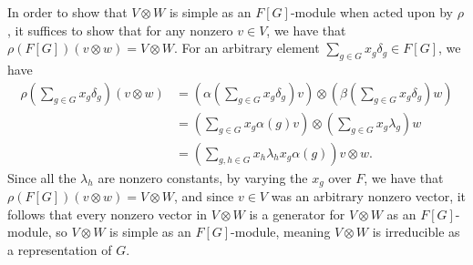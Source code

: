 \documentclass[10pt]{mypackage}
\begin{document}
\begin{solution}
\begin{enumerate}[(a)]
      In order to show that $V\otimes W$ is simple as an $F[G]$-module when acted upon by $\rho$, it suffices to show that for any nonzero $v\in V$, we have that $\rho\left( F[G] \right)\left( v\otimes w \right) = V\otimes W$. For an arbitrary element $\sum_{g\in G}x_g \delta_g\in F[G]$, we have
      \begin{align*}
        \rho\left( \sum_{g\in G}x_g\delta_g \right)\left( v\otimes w \right) &= \left( \alpha\left( \sum_{g\in G}x_g\delta_g \right)v \right)\otimes \left( \beta\left( \sum_{g\in G}x_g \delta_g \right)w \right)\\
                                                                             &= \left( \sum_{g\in G}x_g\alpha(g)v \right)\otimes \left( \sum_{g\in G}x_g\lambda_g \right)w\\
                                                                             &= \left( \sum_{g,h\in G}x_h\lambda_hx_g\alpha(g) \right)v\otimes w.
      \end{align*}
      Since all the $\lambda_h$ are nonzero constants, by varying the $x_g$ over $F$, we have that $\rho\left( F[G] \right)\left( v\otimes w \right) = V\otimes W$, and since $v\in V$ was an arbitrary nonzero vector, it follows that every nonzero vector in $V\otimes W$ is a generator for $V\otimes W$ as an $F[G]$-module, so $V\otimes W$ is simple as an $F[G]$-module, meaning $V\otimes W$ is irreducible as a representation of $G$.
  \end{enumerate}
\end{solution}
\end{document}
